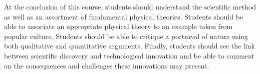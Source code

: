 {At the conclusion of this course, students should understand the scientific method as well as an assortment of fundamental physical theories. Students should be able to associate an appropriate physical theory to an example taken from popular culture. Students should be able to critique a portrayal of nature using both qualitative and quantitative arguments. Finally, students should see the link between scientific discovery and technological innovation and be able to comment on the consequences and challenges these innovations may present.}
